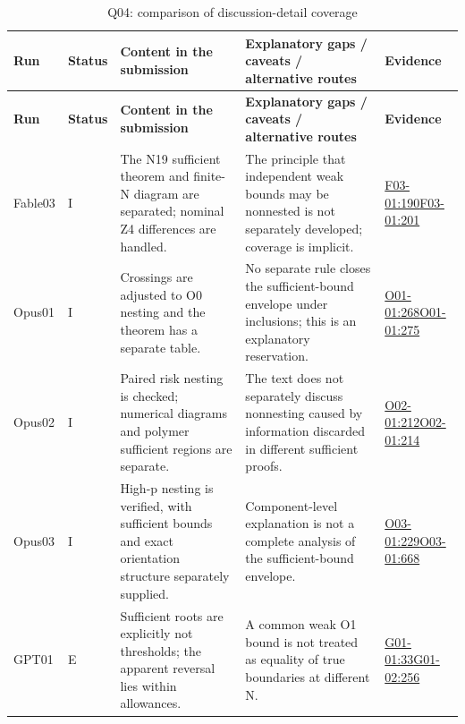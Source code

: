 \documentclass[11pt,a4paper]{article}
\begin{document}
{\fontsize{9.0}{12.6}\selectfont
\setlength{\tabcolsep}{2.5pt}
\begin{longtable}{>{\raggedright\arraybackslash}p{}>{\raggedright\arraybackslash}p{}>{\raggedright\arraybackslash}p{}>{\raggedright\arraybackslash}p{}>{\raggedright\arraybackslash}p{}}
\caption{Q04: comparison of discussion-detail coverage}\\
\toprule
\textbf{Run} & \textbf{Status} & \textbf{Content in the submission} & \textbf{Explanatory gaps /\allowbreak{} caveats /\allowbreak{} alternative routes} & \textbf{Evidence}\tabularnewline
\midrule
\endfirsthead
\toprule
\textbf{Run} & \textbf{Status} & \textbf{Content in the submission} & \textbf{Explanatory gaps /\allowbreak{} caveats /\allowbreak{} alternative routes} & \textbf{Evidence}\tabularnewline
\midrule
\endhead
{}Fable03 & I & The N19 sufficient theorem and finite-N diagram are separated; nominal Z4 differences are handled. & The principle that independent weak bounds may be nonnested is not separately developed; coverage is implicit. & \hyperref[src:F03-01]{F03-01:190}\newline \hyperref[src:F03-01]{F03-01:201}\tabularnewline
{}Opus01 & I & Crossings are adjusted to O0 nesting and the theorem has a separate table. & No separate rule closes the sufficient-bound envelope under inclusions; this is an explanatory reservation. & \hyperref[src:O01-01]{O01-01:268}\newline \hyperref[src:O01-01]{O01-01:275}\tabularnewline
{}Opus02 & I & Paired risk nesting is checked; numerical diagrams and polymer sufficient regions are separate. & The text does not separately discuss nonnesting caused by information discarded in different sufficient proofs. & \hyperref[src:O02-01]{O02-01:212}\newline \hyperref[src:O02-01]{O02-01:214}\tabularnewline
{}Opus03 & I & High-p nesting is verified,\allowbreak{} with sufficient bounds and exact orientation structure separately supplied. & Component-level explanation is not a complete analysis of the sufficient-bound envelope. & \hyperref[src:O03-01]{O03-01:229}\newline \hyperref[src:O03-01]{O03-01:668}\tabularnewline
{}GPT01 & E & Sufficient roots are explicitly not thresholds; the apparent reversal lies within allowances. & A common weak O1 bound is not treated as equality of true boundaries at different N. & \hyperref[src:G01-01]{G01-01:33}\newline \hyperref[src:G01-02]{G01-02:256}\tabularnewline

\end{longtable}}
\end{document}
